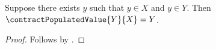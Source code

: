 

\begin{proposition}\label{whole_contract_swapped}
    Suppose there exists $y$ such that $y\in X$ and $y\in Y$.
    Then $\contractPopulatedValue{Y}{X}=Y$.
\end{proposition}
\begin{proof}
    Follows by .
\end{proof}
